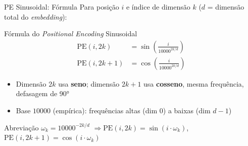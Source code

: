 \documentclass[aspectratio=169, xcolor=dvipsnames]{beamer}
\begin{document}
  \begin{frame}{PE Sinusoidal: Fórmula}
    Para posição $i$ e índice de dimensão $k$ ($d$ = dimensão total do \textit{embedding}):
    \begin{block}{Fórmula do \textit{Positional Encoding} Sinusoidal}
      \begin{align*}
        \text{PE}(i, 2k)   &= \sin\!\left( \frac{i}{10000^{2k/d}} \right) \\[4pt]
        \text{PE}(i, 2k{+}1) &= \cos\!\left( \frac{i}{10000^{2k/d}} \right)
      \end{align*}
    \end{block}
    \begin{itemize}
      \item Dimensão $2k$ usa \textbf{seno}; dimensão $2k{+}1$ usa \textbf{cosseno}, mesma frequência, defasagem de 90°
      \item Base $10000$ (empírica): frequências altas (dim 0) a baixas (dim $d{-}1$)
    \end{itemize}
    \begin{exampleblock}{Abreviação}
      $\omega_k = 10000^{-2k/d}$ \quad$\Rightarrow$\quad $\text{PE}(i, 2k) = \sin(i \cdot \omega_k)$, \; $\text{PE}(i, 2k{+}1) = \cos(i \cdot \omega_k)$
    \end{exampleblock}
  \end{frame}
\end{document}
